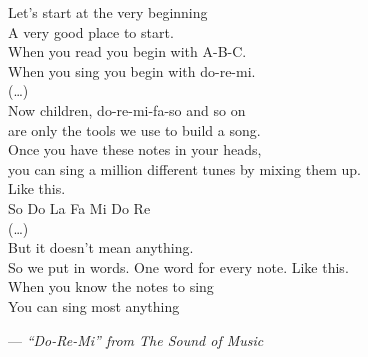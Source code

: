\thispagestyle{empty}
\null
\vfill
\newlength{\quotewidth}
\settowidth{}
\begin{center}
  \parbox{\quotewidth}{
    Let's start at the very beginning \\
    A very good place to start. \\
    When you read you begin with A-B-C. \\
    When you sing you begin with do-re-mi. \\
    (\dots) \\
    Now children, do-re-mi-fa-so and so on \\
    are only the tools we use to build a song. \\
    Once you have these notes in your heads, \\
    you can sing a million different tunes by mixing them up. \\
    Like this. \\
    So Do La Fa Mi Do Re \\
    (\dots) \\
    But it doesn't mean anything. \\
    So we put in words. One word for every note. Like this. \\
    When you know the notes to sing \\
    You can sing most anything
    \par\bigskip
    \hfill --- \textit{``Do-Re-Mi'' from The Sound of Music}
  }
\end{center}
\vfill
